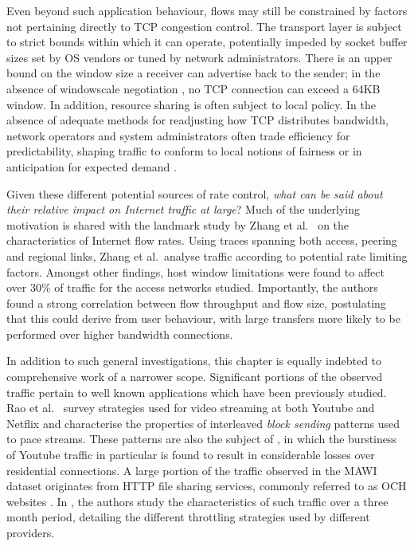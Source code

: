 Even beyond such application behaviour, flows may still be constrained by factors not pertaining directly to \ac{TCP} congestion control.
The transport layer is subject to strict bounds within which it can operate, potentially impeded by socket buffer sizes set by \acf{OS} vendors or tuned by network administrators. 
There is an upper bound on the window size a receiver can advertise back to the sender; in the absence of windowscale negotiation \cite{braden1989rfc}, no \ac{TCP} connection can exceed a 64KB window. 
In addition, resource sharing is often subject to local policy.
In the absence of adequate methods for readjusting how \ac{TCP} distributes bandwidth, network operators and system administrators often trade efficiency for predictability, shaping traffic to conform to local notions of fairness or in anticipation for expected demand \cite{ispTrafficShaping}.

Given these different potential sources of rate control, \emph{what can be said about their relative impact on Internet traffic at large}?
Much of the underlying motivation is shared with the landmark study by Zhang et al.\ \cite{Zhang:2002p85} on the characteristics of Internet flow rates.
Using traces spanning both access, peering and regional links, Zhang et al.\ analyse traffic according to potential rate limiting factors.
Amongst other findings, host window limitations were found to affect over 30\% of traffic for the access networks studied.
Importantly, the authors found a strong correlation between flow throughput and flow size, postulating that this could derive from user behaviour, with large transfers more likely to be performed over higher bandwidth connections.

In addition to such general investigations, this chapter is equally indebted to comprehensive work of a narrower scope.
Significant portions of the observed traffic pertain to well known applications which have been previously studied.
Rao et al.\ \cite{Rao:2011p547} survey strategies used for video streaming at both Youtube and Netflix and characterise the properties of interleaved \emph{block sending} patterns used to pace streams.
These patterns are also the subject of \cite{Alcock:2011p575}, in which the burstiness of Youtube traffic in particular is found to result in considerable losses over residential connections.
A large portion of the traffic observed in the \acs{MAWI} dataset originates from \ac{HTTP} file sharing services, commonly referred to as \acf{OCH} websites \cite{oneclick1}.
In \cite{SanjuasCuxart:2012p588}, the authors study the characteristics of such traffic over a three month period, detailing the different throttling strategies used by different providers.

